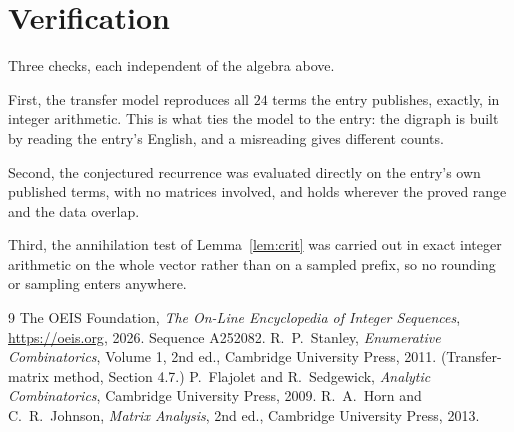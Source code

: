 \documentclass[11pt,a4paper]{article}
\theoremstyle{plain}
\theoremstyle{definition}
\begin{document}
\section{Verification}

Three checks, each independent of the algebra above.

First, the transfer model reproduces all $24$ terms the entry publishes, exactly, in
integer arithmetic. This is what ties the model to the entry: the digraph is built by reading
the entry's English, and a misreading gives different counts.

Second, the conjectured recurrence was evaluated directly on the entry's own published terms,
with no matrices involved, and holds wherever the proved range and the data overlap.

Third, the annihilation test of Lemma~\ref{lem:crit} was carried out in exact integer
arithmetic on the whole vector rather than on a sampled prefix, so no rounding or sampling
enters anywhere.

\begin{thebibliography}{9}
 The OEIS Foundation, \emph{The On-Line Encyclopedia of Integer
Sequences}, \url{https://oeis.org}, 2026. Sequence A252082.
 R.~P.~Stanley, \emph{Enumerative Combinatorics}, Volume 1, 2nd ed.,
Cambridge University Press, 2011. (Transfer-matrix method, Section 4.7.)
 P.~Flajolet and R.~Sedgewick, \emph{Analytic Combinatorics}, Cambridge
University Press, 2009.
 R.~A.~Horn and C.~R.~Johnson, \emph{Matrix Analysis}, 2nd ed., Cambridge
University Press, 2013.
\end{thebibliography}
\end{document}
